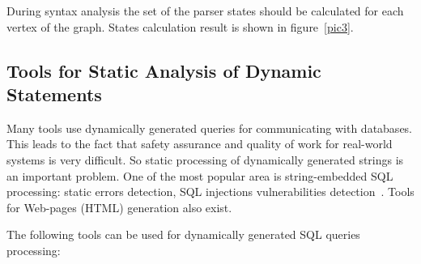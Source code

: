\documentclass{acm_proc_article-sp}
\begin{document}
During syntax analysis the set of the parser states should be calculated for each vertex of the graph. States calculation result is shown in figure~\ref{pic3}.
 
\begin{figure*}
    \centering
    \caption{Parser states for graph in figure~\ref{pic2}.}
    \label{pic3}
\end{figure*}


\subsection{Tools for Static Analysis of Dynamic Statements}

Many tools use dynamically generated queries for communicating with databases. This leads to the fact that safety assurance and quality of work for real-world systems is very difficult. So static processing of dynamically generated strings is an important problem. One of the most popular area is string-embedded SQL processing: static errors detection, SQL injections vulnerabilities detection~\cite{Fu:2007:SAF:1299135.1299784}. Tools for Web-pages (HTML) generation also exist.

The following tools can be used for dynamically generated SQL queries processing:
\end{document}
